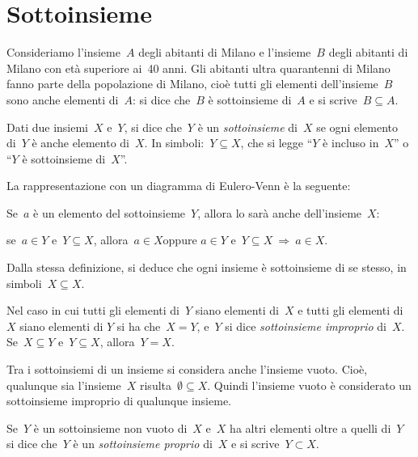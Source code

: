 \ovalbox{\risolvii \ref{ese:\thechapter.33}, \ref{ese:\thechapter.34}, \ref{ese:\thechapter.35}, \ref{ese:\thechapter.36}, \ref{ese:\thechapter.37}, \ref{ese:\thechapter.38}, \ref{ese:\thechapter.39}, \ref{ese:\thechapter.40}}

\section{Sottoinsieme}

Consideriamo l'insieme~$A$ degli abitanti di Milano e l'insieme~$B$ degli abitanti di Milano
con età superiore ai~40 anni. Gli abitanti ultra quarantenni di Milano fanno parte della popolazione di Milano, cioè tutti gli
elementi dell'insieme~$B$ sono anche elementi di~$A$: si dice che~$B$ è sottoinsieme di~$A$ e si scrive~$B\subseteq A$.

\begin{definizione}
Dati due insiemi~$X$ e~$Y$, si dice che~$Y$ è un \emph{sottoinsieme} di~$X$
se ogni elemento di~$Y$ è anche elemento di~$X$.
In simboli:~$Y\subseteq X$, che si legge
``$Y$ è incluso in~$X$'' o ``$Y$ è sottoinsieme di~$X$''.
\end{definizione}

La rappresentazione con un diagramma di Eulero-Venn è la seguente:
\begin{center}

\end{center}
Se~$a$ è un elemento del sottoinsieme~$Y$, allora lo sarà anche dell'insieme~$X$:
\begin{center}
se~$a\in Y$ e~$Y\subseteq X$, allora~$a\in X$\qquad oppure \qquad $a\in Y$ e~$Y\subseteq X \:\Rightarrow\:a\in X$.
\end{center}

Dalla stessa definizione, si deduce che ogni insieme è sottoinsieme di
se stesso, in simboli~$X\subseteq X$.

Nel caso in cui tutti gli elementi di~$Y$ siano elementi di~$X$ e tutti gli elementi di~$X$ siano elementi di
$Y$ si ha che~$X=Y$, e~$Y$ si dice \emph{sottoinsieme improprio} di~$X$.
Se~$X\subseteq Y$ e~$Y\subseteq X$, allora~$Y=X$.

Tra i sottoinsiemi di un insieme si considera anche
l'insieme vuoto. Cioè, qualunque sia
l'insieme~$X$ risulta~$\emptyset \subseteq X$.
Quindi l'insieme vuoto è considerato un sottoinsieme improprio di qualunque insieme.

Se~$Y$ è un sottoinsieme non vuoto di~$X$ e~$X$ ha altri elementi oltre a quelli di~$Y$
si dice che~$Y$ è un \emph{sottoinsieme proprio} di~$X$ e si scrive~$Y\subset X$.

